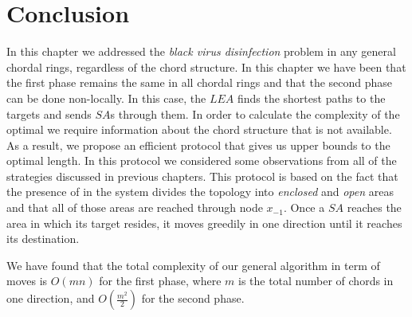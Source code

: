 %
%
%
%
%
%
%
%
%
%
% 


\section{Conclusion}
In this chapter we addressed the {\it black virus disinfection} problem in any general chordal rings, regardless of the chord structure. In this chapter we have been that the first phase remains the same in all chordal rings and that the second phase can be done non-locally. In this case, the $LEA$ finds the shortest paths to the targets and sends $SA$s through them. In order to calculate the complexity of the optimal we require information about the chord structure that is not available. As a result, we propose an efficient protocol that gives us upper bounds to the optimal length. In this protocol we considered some observations from all of the strategies discussed in previous chapters. This protocol is based on the fact that the presence of  \bvs in the system divides the topology into {\em enclosed} and {\em open} areas and that all of those areas are reached through node $x_{-1}$. Once a $SA$ reaches the area in which its target resides, it moves greedily in one direction until it reaches its destination. 

We have found that the total complexity of our general algorithm  in  term of moves is $O(mn)$ for the first phase, where $m$ is the total number of chords in one direction, and $O(\frac {m^2} { 2})$ for the second phase.

%




